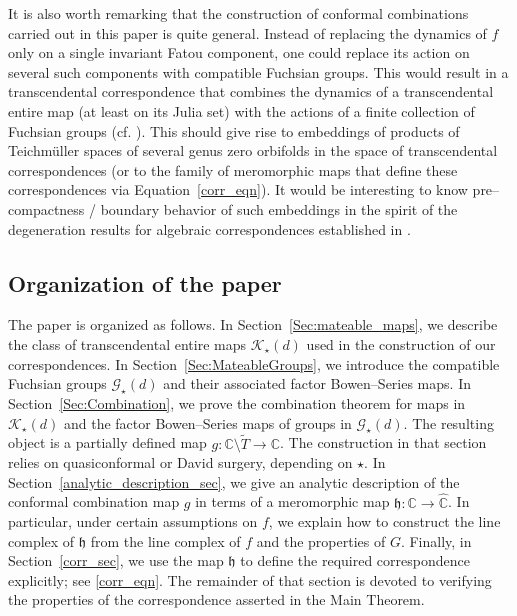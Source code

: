 \documentclass[11pt,a4paper, oneside]{amsart}
\theoremstyle{definition}
\theoremstyle{remark}
\numberwithin{equation}{section}
\newcommand{\Kstar}{{\mathscr K_\star}}
\newcommand{\Gstar}{\mathscr G_\star}
\newcommand{\C}{\mathbb{C}}
\newcommand{\Cc}{\widehat{{\C}}}
\newcommand{\sm}{\setminus}
\renewcommand{\tilde}{\widetilde}
\begin{document}
It is also worth remarking that the construction of conformal combinations carried out in this paper is quite general. Instead of replacing the dynamics of $f$ only on a single invariant Fatou component, one could replace its action on several such components with compatible Fuchsian groups. This would result in a transcendental correspondence that combines the dynamics of a transcendental entire map (at least on its Julia set) with the actions of a finite collection of Fuchsian groups (cf. \cite{MV25}). This should give rise to embeddings of products of Teichm{\"u}ller spaces of several genus zero orbifolds in the space of transcendental correspondences (or to the family of meromorphic maps that define these correspondences via Equation~\eqref{corr_eqn}). It would be interesting to know pre--compactness / boundary behavior of such embeddings in the spirit of the degeneration results for algebraic correspondences established in \cite{LMM26}.

\subsection{Organization of the paper} 

The paper is organized as follows. In Section~\ref{Sec:mateable_maps}, we describe the class of transcendental entire maps $\Kstar(d)$ used in the construction of our correspondences. In Section~\ref{Sec:MateableGroups}, we introduce the compatible Fuchsian groups $\Gstar(d)$ and their associated factor Bowen--Series maps. In Section~\ref{Sec:Combination}, we prove the combination theorem for maps in $\Kstar(d)$ and the factor Bowen--Series maps of groups in $\Gstar(d)$. The resulting object is a partially defined map $g \colon \C \sm \tilde T \to \C$. The construction in that section relies on quasiconformal or David surgery, depending on $\star$. In Section~\ref{analytic_description_sec}, we give an analytic description of the conformal combination map $g$ in terms of a meromorphic map $\mathfrak{h} \colon \C \to \Cc$. In particular, under certain assumptions on $f$, we explain how to construct the line complex of $\mathfrak{h}$ from the line complex of $f$ and the properties of $G$. Finally, in Section~\ref{corr_sec}, we use the map $\mathfrak{h}$ to define the required correspondence explicitly; see \eqref{corr_eqn}. The remainder of that section is devoted to verifying the properties of the correspondence asserted in the Main Theorem.
\end{document}
